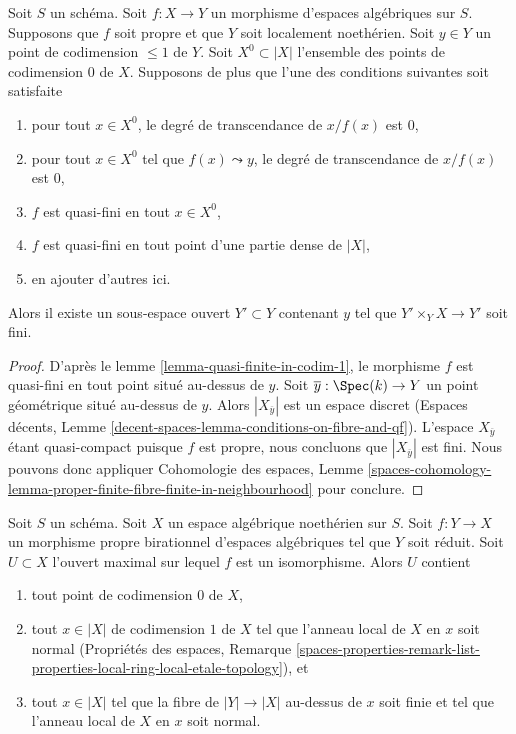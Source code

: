 \begin{lemma}
\label{lemma-finite-in-codim-1}
Soit $S$ un schéma. Soit $f : X \to Y$ un morphisme d'espaces algébriques
sur $S$. Supposons que $f$ soit propre et que $Y$ soit localement
noethérien. Soit $y \in Y$ un point de codimension $\leq 1$ de $Y$.
Soit $X^0 \subset |X|$ l'ensemble des points de codimension $0$ de $X$.
Supposons de plus que l'une des
conditions suivantes soit satisfaite
\begin{enumerate}
\item pour tout $x \in X^0$, le degré de transcendance de $x/f(x)$ est $0$,
\item pour tout $x \in X^0$ tel que $f(x) \leadsto y$, le degré de transcendance
de $x/f(x)$ est $0$,
\item $f$ est quasi-fini en tout $x \in X^0$,
\item $f$ est quasi-fini en tout point d'une partie dense de $|X|$,
\item en ajouter d'autres ici.
\end{enumerate}
Alors il existe un sous-espace ouvert $Y' \subset Y$ contenant $y$ tel que
$Y' \times_Y X \to Y'$ soit fini.
\end{lemma}

\begin{proof}
D'après le lemme \ref{lemma-quasi-finite-in-codim-1}, le morphisme $f$ est
quasi-fini en tout point situé au-dessus de $y$. Soit $\overline{y} : \Spec(k) \to Y$
un point géométrique situé au-dessus de $y$. Alors $|X_{\overline{y}}|$ est un espace
discret (Espaces décents, Lemme
\ref{decent-spaces-lemma-conditions-on-fibre-and-qf}).
L'espace $X_{\overline{y}}$ étant quasi-compact puisque $f$ est propre, nous concluons
que $|X_{\overline{y}}|$ est fini.
Nous pouvons donc appliquer Cohomologie des espaces, Lemme
\ref{spaces-cohomology-lemma-proper-finite-fibre-finite-in-neighbourhood}
pour conclure.
\end{proof}

\begin{lemma}
\label{lemma-modification-normal-iso-over-codimension-1}
Soit $S$ un schéma. Soit $X$ un espace algébrique noethérien sur $S$.
Soit $f : Y \to X$ un morphisme propre birationnel d'espaces algébriques
tel que $Y$ soit réduit.
Soit $U \subset X$ l'ouvert maximal sur lequel $f$ est un isomorphisme.
Alors $U$ contient
\begin{enumerate}
\item tout point de codimension $0$ de $X$,
\item tout $x \in |X|$ de codimension $1$ de $X$ tel que l'anneau local
de $X$ en $x$ soit normal (Propriétés des espaces, Remarque
\ref{spaces-properties-remark-list-properties-local-ring-local-etale-topology}),
et
\item tout $x \in |X|$ tel que la fibre de $|Y| \to |X|$ au-dessus de $x$ soit
finie et tel que l'anneau local de $X$ en $x$ soit normal.
\end{enumerate}
\end{lemma}

